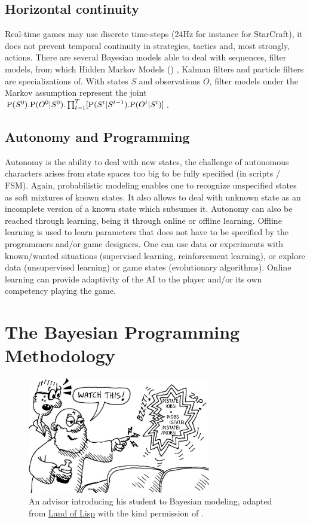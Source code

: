 \subsection{Horizontal continuity}
Real-time games may use discrete time-steps (24Hz for instance for StarCraft), it does not prevent temporal continuity in strategies, tactics and, most strongly, actions. There are several Bayesian models able to deal with sequences, filter models, from which Hidden Markov Models () \citep{Rabiner}, Kalman filters \citep{Kalman1960} and particle filters \citep{particleFiltering} are specializations of. With states $S$ and observations $O$, filter models under the Markov assumption represent the joint $\mathrm{P}(S^0).\mathrm{P}(O^0|S^0).\prod_{t=1}^T[\mathrm{P}(S^t | S^{t-1}).\mathrm{P}(O^t|S^t)]$.

\subsection{Autonomy and Programming}
Autonomy is the ability to deal with new states, the challenge of autonomous characters arises from state spaces too big to be fully specified (in scripts / FSM). Again, probabilistic modeling enables one to recognize unspecified states as soft mixtures of known states. It also allows to deal with unknown state as an incomplete version of a known state which subsumes it. Autonomy can also be reached through learning, being it through online or offline learning. Offline learning is used to learn parameters that does not have to be specified by the programmers and/or game designers. One can use data or experiments with known/wanted situations (supervised learning, reinforcement learning), or explore data (unsupervised learning) or game states (evolutionary algorithms). Online learning can provide adaptivity of the AI to the player and/or its own competency playing the game.

\section{The Bayesian Programming Methodology}

\begin{figure}[!ht]
\centering
\includegraphics[width=8cm]{images/zapBayes3.png}
\caption{An advisor introducing his student to Bayesian modeling, adapted from \underline{Land of Lisp} with the kind permission of \cite{LoL}.}
\end{figure}


